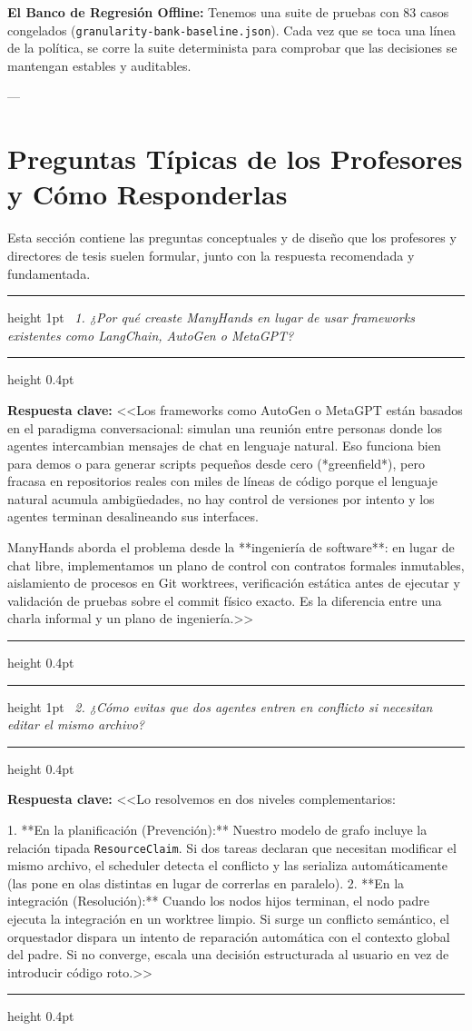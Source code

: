 \documentclass[11pt,a4paper]{article}
\newenvironment{qaquestion}[1]{%
  \par\vspace{0.8em}
  \noindent\begin{minipage}{\textwidth}
  \color{darkgray}\hrule height 1pt\vspace{0.4em}
  \noindent{\bfseries\color{primaryblue}Pregunta de los profesores:}\ \textit{#1}\vspace{0.4em}
  \color{darkgray}\hrule height 0.4pt\vspace{0.6em}
  \color{black}\normalsize
}{%
  \vspace{0.6em}\color{darkgray}\hrule height 0.4pt
  \end{minipage}\par\vspace{0.8em}
}
\begin{document}
\noindent\textbf{El Banco de Regresión Offline:}  
Tenemos una suite de pruebas con 83 casos congelados (\texttt{granularity-bank-baseline.json}). Cada vez que se toca una línea de la política, se corre la suite determinista para comprobar que las decisiones se mantengan estables y auditables.

---

\section{Preguntas Típicas de los Profesores y Cómo Responderlas}

Esta sección contiene las preguntas conceptuales y de diseño que los profesores y directores de tesis suelen formular, junto con la respuesta recomendada y fundamentada.

\begin{qaquestion}{1. ¿Por qué creaste ManyHands en lugar de usar frameworks existentes como LangChain, AutoGen o MetaGPT?}
  \textbf{Respuesta clave:}  
  <<Los frameworks como AutoGen o MetaGPT están basados en el paradigma conversacional: simulan una reunión entre personas donde los agentes intercambian mensajes de chat en lenguaje natural. Eso funciona bien para demos o para generar scripts pequeños desde cero (*greenfield*), pero fracasa en repositorios reales con miles de líneas de código porque el lenguaje natural acumula ambigüedades, no hay control de versiones por intento y los agentes terminan desalineando sus interfaces.

  ManyHands aborda el problema desde la **ingeniería de software**: en lugar de chat libre, implementamos un plano de control con contratos formales inmutables, aislamiento de procesos en Git worktrees, verificación estática antes de ejecutar y validación de pruebas sobre el commit físico exacto. Es la diferencia entre una charla informal y un plano de ingeniería.>>
\end{qaquestion}

\begin{qaquestion}{2. ¿Cómo evitas que dos agentes entren en conflicto si necesitan editar el mismo archivo?}
  \textbf{Respuesta clave:}  
  <<Lo resolvemos en dos niveles complementarios:
  
  1. **En la planificación (Prevención):** Nuestro modelo de grafo incluye la relación tipada \texttt{ResourceClaim}. Si dos tareas declaran que necesitan modificar el mismo archivo, el scheduler detecta el conflicto y las serializa automáticamente (las pone en olas distintas en lugar de correrlas en paralelo).
  2. **En la integración (Resolución):** Cuando los nodos hijos terminan, el nodo padre ejecuta la integración en un worktree limpio. Si surge un conflicto semántico, el orquestador dispara un intento de reparación automática con el contexto global del padre. Si no converge, escala una decisión estructurada al usuario en vez de introducir código roto.>>
\end{qaquestion}
\end{document}
